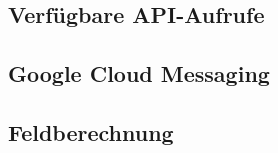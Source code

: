 
\subsection{Verfügbare API-Aufrufe}

\subsection{Google Cloud Messaging}

\subsection{Feldberechnung}
\label{subsec:Feldberechnung}
